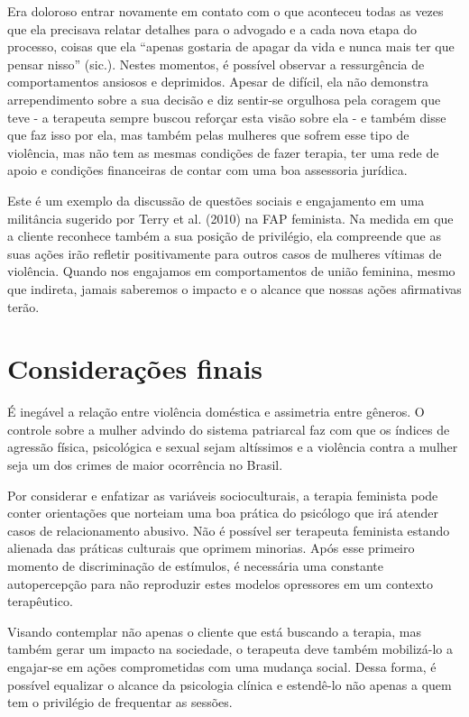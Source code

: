 Era doloroso entrar novamente em contato com o que aconteceu todas as vezes que ela precisava relatar detalhes para o advogado e a cada nova etapa do processo, coisas que ela “apenas gostaria de apagar da vida e nunca mais ter que pensar nisso” (sic.). Nestes momentos, é possível observar a ressurgência de comportamentos ansiosos e deprimidos. Apesar de difícil, ela não demonstra arrependimento sobre a sua decisão e diz sentir-se orgulhosa pela coragem que teve - a terapeuta sempre buscou reforçar esta visão sobre ela - e também disse que faz isso por ela, mas também pelas mulheres que sofrem esse tipo de violência, mas não tem as mesmas condições de fazer terapia, ter uma rede de apoio e condições financeiras de contar com uma boa assessoria jurídica.

Este é um exemplo da discussão de questões sociais e engajamento em uma militância sugerido por Terry et al. (2010) na FAP feminista. Na medida em que a cliente reconhece também a sua posição de privilégio, ela compreende que as suas ações irão refletir positivamente para outros casos de mulheres vítimas de violência. Quando nos engajamos em comportamentos de união feminina, mesmo que indireta, jamais saberemos o impacto e o alcance que nossas ações afirmativas terão. 

\section{Considerações finais}

É inegável a relação entre violência doméstica e assimetria entre gêneros. O controle sobre a mulher advindo do sistema patriarcal faz com que os índices de agressão física, psicológica e sexual sejam altíssimos e a violência contra a mulher seja um dos crimes de maior ocorrência no Brasil.

Por considerar e enfatizar as variáveis socioculturais, a terapia feminista pode conter orientações que norteiam uma boa prática do psicólogo que irá atender casos de relacionamento abusivo. Não é possível ser terapeuta feminista estando alienada das práticas culturais que oprimem minorias. Após esse primeiro momento de discriminação de estímulos, é necessária uma constante autopercepção para não reproduzir estes modelos opressores em um contexto terapêutico.

Visando contemplar não apenas o cliente que está buscando a terapia, mas também gerar um impacto na sociedade, o terapeuta deve também mobilizá-lo a engajar-se em ações comprometidas com uma mudança social. Dessa forma, é possível equalizar o alcance da psicologia clínica e estendê-lo não apenas a quem tem o privilégio de frequentar as sessões.


